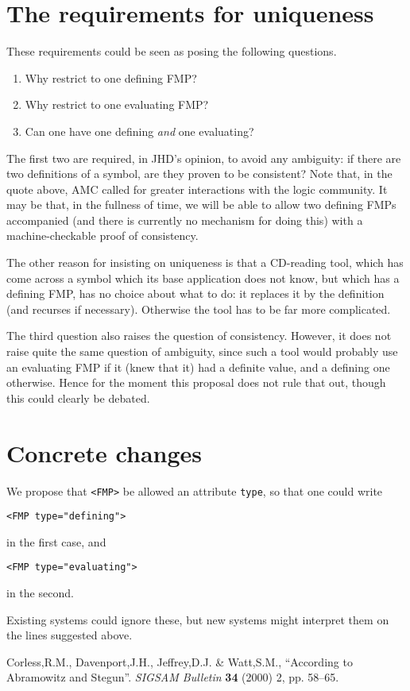 \documentclass[11pt]{openmathTN}
\begin{document}
\section{The requirements for uniqueness}
These requirements could be seen as posing the following questions.
\begin{enumerate}
\item Why restrict to one defining FMP?
\item Why restrict to one evaluating FMP?
\item Can one have one defining {\it and\/} one evaluating?
\end{enumerate}
The first two are required, in JHD's opinion, to avoid any ambiguity: if
there are two definitions of a symbol, are they proven to be consistent?
Note that, in the quote above, AMC called for greater interactions with the
logic community. It may be that, in the fullness of time, we will be able
to allow two defining FMPs accompanied (and there is currently no mechanism
for doing this) with a machine-checkable proof of consistency.
\par
The other reason for insisting on uniqueness is that a CD-reading tool,
which has come across a symbol which its base application does not know,
but which has a defining FMP, has no choice about what to do: it replaces
it by the definition (and recurses if necessary). Otherwise the tool has to
be far more complicated.
\par
The third question also raises the question of consistency. However, it
does not raise quite the same question of ambiguity, since such a tool
would probably use an evaluating FMP if it (knew that it) had a definite
value, and a defining one otherwise. Hence for the moment this proposal
does not rule that out, though this could clearly be debated.
\section{Concrete changes}
We propose that \verb+<FMP>+ be allowed an attribute \verb+type+, so
that one could write
\begin{verbatim}
<FMP type="defining">
\end{verbatim}
in the first case, and
\begin{verbatim}
<FMP type="evaluating">
\end{verbatim}
in the second.
\par
Existing systems could ignore these, but new systems might interpret
them on the lines suggested above.
\begin{thebibliography}{99}
Corless,R.M., Davenport,J.H., Jeffrey,D.J. \& Watt,S.M.,
``According to Abramowitz and Stegun''.
{\it SIGSAM Bulletin\/} {\bf34} (2000) 2, pp. 58--65.
\end{thebibliography}
\end{document}
